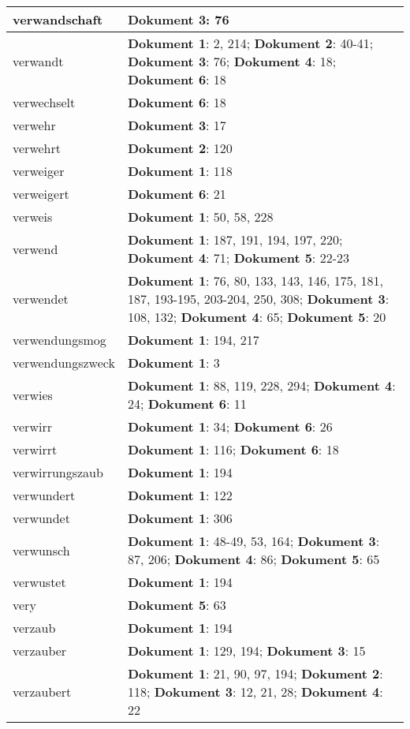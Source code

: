 \documentclass[a5paper]{article}
\begin{document}
\begin{longtable}[l]{|l|p{3in}|}
\hline
verwandschaft & \textbf{Dokument 3}: 76 \\
\hline
verwandt & \textbf{Dokument 1}: 2, 214; \textbf{Dokument 2}: 40-41; \textbf{Dokument 3}: 76; \textbf{Dokument 4}: 18; \textbf{Dokument 6}: 18 \\
\hline
verwechselt & \textbf{Dokument 6}: 18 \\
\hline
verwehr & \textbf{Dokument 3}: 17 \\
\hline
verwehrt & \textbf{Dokument 2}: 120 \\
\hline
verweiger & \textbf{Dokument 1}: 118 \\
\hline
verweigert & \textbf{Dokument 6}: 21 \\
\hline
verweis & \textbf{Dokument 1}: 50, 58, 228 \\
\hline
verwend & \textbf{Dokument 1}: 187, 191, 194, 197, 220; \textbf{Dokument 4}: 71; \textbf{Dokument 5}: 22-23 \\
\hline
verwendet & \textbf{Dokument 1}: 76, 80, 133, 143, 146, 175, 181, 187, 193-195, 203-204, 250, 308; \textbf{Dokument 3}: 108, 132; \textbf{Dokument 4}: 65; \textbf{Dokument 5}: 20 \\
\hline
verwendungsmog & \textbf{Dokument 1}: 194, 217 \\
\hline
verwendungszweck & \textbf{Dokument 1}: 3 \\
\hline
verwies & \textbf{Dokument 1}: 88, 119, 228, 294; \textbf{Dokument 4}: 24; \textbf{Dokument 6}: 11 \\
\hline
verwirr & \textbf{Dokument 1}: 34; \textbf{Dokument 6}: 26 \\
\hline
verwirrt & \textbf{Dokument 1}: 116; \textbf{Dokument 6}: 18 \\
\hline
verwirrungszaub & \textbf{Dokument 1}: 194 \\
\hline
verwundert & \textbf{Dokument 1}: 122 \\
\hline
verwundet & \textbf{Dokument 1}: 306 \\
\hline
verwunsch & \textbf{Dokument 1}: 48-49, 53, 164; \textbf{Dokument 3}: 87, 206; \textbf{Dokument 4}: 86; \textbf{Dokument 5}: 65 \\
\hline
verwustet & \textbf{Dokument 1}: 194 \\
\hline
very & \textbf{Dokument 5}: 63 \\
\hline
verzaub & \textbf{Dokument 1}: 194 \\
\hline
verzauber & \textbf{Dokument 1}: 129, 194; \textbf{Dokument 3}: 15 \\
\hline
verzaubert & \textbf{Dokument 1}: 21, 90, 97, 194; \textbf{Dokument 2}: 118; \textbf{Dokument 3}: 12, 21, 28; \textbf{Dokument 4}: 22 \\

\end{longtable}
\end{document}
